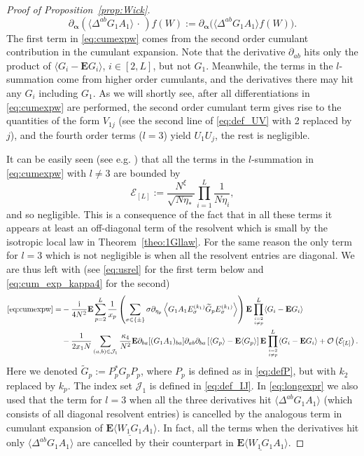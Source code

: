 \documentclass[10pt]{amsart}
\numberwithin{equation}{section}
\newcommand{\E}{\mathbf{E}}
\newcommand{\ii}{\mathrm{i}}
\begin{document}
\begin{proof}[Proof of Proposition~\ref{prop:Wick}]
\[
\partial_{{\bm\alpha}}(\langle \Delta^{ab}G_1A_1\rangle\,\cdot\,)f(W):=\partial_{{\bm\alpha}}\big(\langle \Delta^{ab}G_1A_1\rangle f(W)\big).
\]
The first term in \eqref{eq:cumexpw} comes from the second order cumulant contribution in the cumulant expansion. Note that the derivative $\partial_{ab}$ hits only the product of $\langle G_i-\E G_i\rangle$, $i\in [2,L]$, but not $G_1$.  Meanwhile, the terms in the $l$-summation come from higher order cumulants, and the derivatives there may hit any $G_i$ including $G_1$. As we will shortly see, after all differentiations in \eqref{eq:cumexpw} are performed, the second order cumulant term gives rise to the quantities of the form $V_{1j}$ (see the second line of \eqref{eq:def_UV} with 2 replaced by~$j$), and the fourth order terms ($l=3$) yield $U_1U_j$, the rest is negligible.


It can be easily seen (see e.g. \cite[Section 6]{macroCLT_complex}) that all the terms in the $l$-summation in \eqref{eq:cumexpw} with $l\ne 3$ are bounded by
\[
\mathcal{E}_{[L]}:=\frac{N^\xi}{\sqrt{N\eta_*}}\prod_{i=1}^L\frac{1}{N\eta_i},
\]
and so negligible. This is a consequence of the fact that in all these terms it appears at least an off-diagonal term of the resolvent which is small by the isotropic local law in Theorem~\ref{theo:1Gllaw}. For the same reason the only term for $l=3$ which is not negligible is when all the resolvent entries are diagonal. We are thus left with (see \eqref{eq:usrel} for the first term below and \eqref{eq:cum_exp_kappa4} for the second)
\begin{equation}
\begin{split}
\label{eq:longexpr}
\eqref{eq:cumexpw}=&-\frac{\ii}{4N^2}\E\sum_{p=2}^L \frac{1}{x_p}\left(\sum_{\sigma\in\{\pm\}} \sigma\partial_{\eta_p}\left\langle G_1A_1E_\sigma^{(k_1)} \widetilde{G}_pE_\sigma^{(k_1)}\right\rangle\right)\E\prod_{i=2 \atop i\ne p}^L\langle G_i-\E G_i\rangle \\
&-\frac{1}{2x_1N}\sum_{(a,b)\in\mathcal{J}_1} \frac{\kappa_4}{N^2} \E \partial_{ba} [(G_1A_1)_{ba}]\partial_{ab}\partial_{ba} \left[ \langle G_p\rangle -\E\langle G_p\rangle\right] \E\prod_{i=2 \atop i\ne p}^L\langle G_i-\E G_i\rangle+\mathcal{O}\left(\mathcal{E}_{[L]}\right).
\end{split}
\end{equation}
Here we denoted $\widetilde{G}_p:=P_p^*G_pP_p$, where $P_p$ is defined as in \eqref{eq:defP}, but with $k_2$ replaced by $k_p$. The index set $\mathcal{J}_1$ is defined in \eqref{eq:def_IJ}. In \eqref{eq:longexpr} we also used that the term for $l=3$ when all the three derivatives hit $\langle \Delta^{ab}G_1A_1\rangle$ (which consists of all diagonal resolvent entries) is cancelled by the analogous term in cumulant expansion of $\E\langle\underline{W_1G_1}A_1\rangle$. In fact, all the terms when the derivatives hit only $\langle \Delta^{ab}G_1A_1\rangle$ are cancelled by their counterpart in $\E\langle\underline{W_1G_1}A_1\rangle$.



\end{proof}
\end{document}
